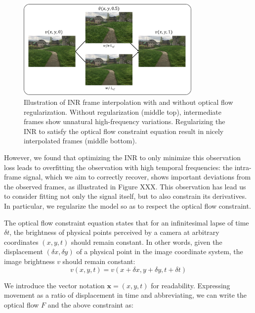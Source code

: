 \documentclass{article}
\begin{document}
\begin{figure}[t]
\centering
\includegraphics[width=0.8\textwidth]{"w_wo_OF"}
\caption{Illustration of INR frame interpolation with and without optical flow regularization.
Without regularization (middle top), intermediate frames show unnatural high-frequency variations.
Regularizing the INR to satisfy the optical flow constraint equation result in nicely interpolated frames (middle bottom).
}
\label{fig_w_wo_OF}
\end{figure}

However, we found that optimizing the INR to only minimize this observation loss leads to overfitting the observation with high temporal frequencies:
the intra-frame signal, which we aim to correctly recover, shows important deviations from the observed frames, as illustrated in Figure XXX.
This observation has lead us to consider fitting not only the signal itself, but to also constrain its derivatives.
In particular, we regularize the model so as to respect the optical flow constraint.


The optical flow constraint equation states that for an infinitesimal lapse of time $\delta t$,
the brightness of physical points perceived by a camera at arbitrary coordinates $(x,y,t)$ should remain constant.
In other words, given the displacement $(\delta x, \delta y)$ of a physical point in the image coordinate system,
the image brightness $v$ should remain constant:
\begin{equation}
v(x, y, t)=v(x + \delta x, y + \delta y, t + \delta t)
\end{equation}

We introduce the vector notation $\textbf{x}=(x,y,t)$ for readability.
Expressing movement as a ratio of displacement in time and abbreviating,
we can write the optical flow $F$ and the above constraint as:
\end{document}
